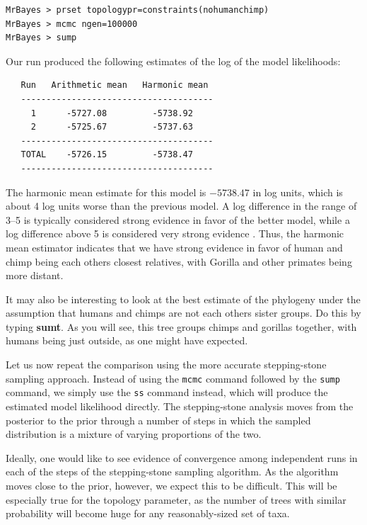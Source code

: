 \documentclass[12pt]{book}
\newcommand{\ttt}[1]{\texttt{#1} }
\begin{document}
\begin{singlespacing}
\begin{verbatim}
MrBayes > prset topologypr=constraints(nohumanchimp)
MrBayes > mcmc ngen=100000
MrBayes > sump
\end{verbatim}
\end{singlespacing}

Our run produced the following estimates of the log of the model likelihoods:

\begin{singlespacing}
\begin{verbatim}
   Run   Arithmetic mean   Harmonic mean
   --------------------------------------
     1      -5727.08         -5738.92
     2      -5725.67         -5737.63
   --------------------------------------
   TOTAL    -5726.15         -5738.47
   --------------------------------------
\end{verbatim}
\end{singlespacing}

The harmonic mean estimate for this model is $-5738.47$ in log units, which is about 4 log units worse than the
previous model. A log difference in the range of 3--5 is typically considered strong evidence in favor of the 
better model, while a log difference above 5 is considered very strong evidence \citep{kass95}. Thus,
the harmonic mean estimator indicates that we have strong evidence in favor of human and chimp being
each others closest relatives, with Gorilla and other primates being more distant.

It may also be interesting to look at the best estimate of the phylogeny under the assumption that humans and
chimps are not each others sister groups. Do this by typing \textbf{sumt}. As you will see, this tree groups
chimps and gorillas together, with humans being just outside, as one might have expected.

Let us now repeat the comparison using the more accurate stepping-stone sampling approach. Instead of using the
\ttt{mcmc} command followed by the \ttt{sump} command, we simply use the \ttt{ss} command instead,
which will produce the estimated model likelihood directly. The
stepping-stone analysis moves from the posterior to the prior through a number of steps in which the sampled
distribution is a mixture of varying proportions of the two.

Ideally, one would like to see evidence of convergence among independent runs in each of the steps of the
stepping-stone sampling algorithm. As the algorithm moves close to the prior, however, we expect this to
be difficult. This will be especially true for the topology parameter, as the number of trees with similar probability
will become huge for any reasonably-sized set of taxa.
\end{document}
